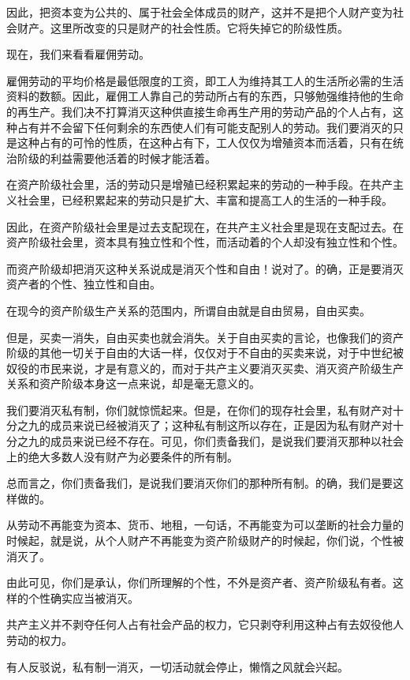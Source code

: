     因此，把资本变为公共的、属于社会全体成员的财产，这并不是把个人财产变为社会财产。这里所改变的只是财产的社会性质。它将失掉它的阶级性质。

    现在，我们来看看雇佣劳动。

    雇佣劳动的平均价格是最低限度的工资，即工人为维持其工人的生活所必需的生活资料的数额。因此，雇佣工人靠自己的劳动所占有的东西，只够勉强维持他的生命的再生产。我们决不打算消灭这种供直接生命再生产用的劳动产品的个人占有，这种占有并不会留下任何剩余的东西使人们有可能支配别人的劳动。我们要消灭的只是这种占有的可怜的性质，在这种占有下，工人仅仅为增殖资本而活着，只有在统治阶级的利益需要他活着的时候才能活着。

    在资产阶级社会里，活的劳动只是增殖已经积累起来的劳动的一种手段。在共产主义社会里，已经积累起来的劳动只是扩大、丰富和提高工人的生活的一种手段。

    因此，在资产阶级社会里是过去支配现在，在共产主义社会里是现在支配过去。在资产阶级社会里，资本具有独立性和个性，而活动着的个人却没有独立性和个性。

    而资产阶级却把消灭这种关系说成是消灭个性和自由！说对了。的确，正是要消灭资产者的个性、独立性和自由。

    在现今的资产阶级生产关系的范围内，所谓自由就是自由贸易，自由买卖。

    但是，买卖一消失，自由买卖也就会消失。关于自由买卖的言论，也像我们的资产阶级的其他一切关于自由的大话一样，仅仅对于不自由的买卖来说，对于中世纪被奴役的市民来说，才是有意义的，而对于共产主义要消灭买卖、消灭资产阶级生产关系和资产阶级本身这一点来说，却是毫无意义的。

    我们要消灭私有制，你们就惊慌起来。但是，在你们的现存社会里，私有财产对十分之九的成员来说已经被消灭了；这种私有制这所以存在，正是因为私有财产对十分之九的成员来说已经不存在。可见，你们责备我们，是说我们要消灭那种以社会上的绝大多数人没有财产为必要条件的所有制。

    总而言之，你们责备我们，是说我们要消灭你们的那种所有制。的确，我们是要这样做的。

    从劳动不再能变为资本、货币、地租，一句话，不再能变为可以垄断的社会力量的时候起，就是说，从个人财产不再能变为资产阶级财产的时候起，你们说，个性被消灭了。

    由此可见，你们是承认，你们所理解的个性，不外是资产者、资产阶级私有者。这样的个性确实应当被消灭。

    共产主义并不剥夺任何人占有社会产品的权力，它只剥夺利用这种占有去奴役他人劳动的权力。

    有人反驳说，私有制一消灭，一切活动就会停止，懒惰之风就会兴起。

